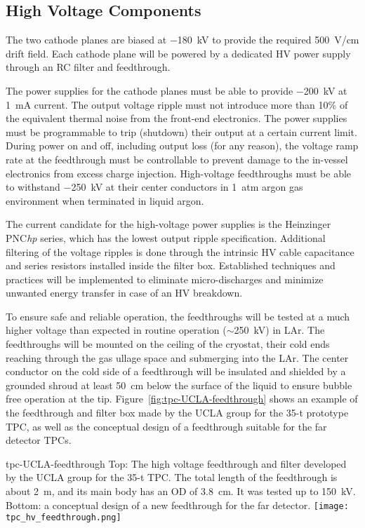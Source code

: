 {%
\subsection{High Voltage Components}  
\label{subsec:fd-ref-hv}
   
The two cathode planes are biased at $-$180~kV to provide the required
500~V/cm drift field. Each cathode plane will be powered by a
dedicated HV power supply through an RC filter and feedthrough.

The power supplies for the cathode planes must be able to provide
$-$200~kV at 1~mA current. The output voltage ripple must not
introduce more than 10\% of the equivalent thermal noise from the
front-end electronics.  The power supplies must be programmable to
trip (shutdown) their output at a certain current limit.  During power
on and off, including output loss (for any reason), the voltage ramp
rate at the feedthrough must be controllable to prevent damage to the
in-vessel electronics from excess charge injection.  High-voltage
feedthroughs must be able to withstand $-$250~kV at their center
conductors in 1~atm argon gas environment when terminated in liquid
argon.


The current candidate for the high-voltage power supplies is the
Heinzinger PNC{\it hp} series, which has the lowest output ripple
specification.  Additional filtering of the voltage ripples is done
through the intrinsic HV cable capacitance and series resistors
installed inside the filter box. Established techniques and practices
will be implemented to eliminate micro-discharges and minimize
unwanted energy transfer in case of an HV breakdown.
  
To ensure safe and reliable operation, the feedthroughs will be tested
at a much higher voltage than expected in routine operation
($\sim$250~kV) in LAr. The feedthroughs will be mounted on
the ceiling of the cryostat, their cold ends reaching through the gas
ullage space and submerging into the LAr. The center
conductor on the cold side of a feedthrough will be insulated and
shielded by a grounded shroud at least 50~cm below the surface of the
liquid to ensure bubble free operation at the
tip. Figure~\ref{fig:tpc-UCLA-feedthrough} shows an example of the
feedthrough and filter box made by the UCLA group for the 35-t prototype TPC,
as well as the conceptual design of a feedthrough suitable for the far
detector TPCs.
\begin{cdrfigure}{tpc-UCLA-feedthrough}
{Top: The high voltage feedthrough and filter developed by the UCLA 
group for the 35-t TPC. The total length of the feedthrough is about 2~m, and its main body has an OD of 3.8~cm.  It was tested up to 150~kV.  
Bottom: a conceptual design of a new feedthrough for the far detector.}
\texttt{[image: tpc\_hv\_feedthrough.png]}
\end{cdrfigure}


}
